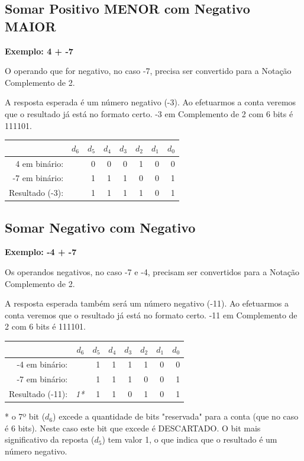 \subsection{Somar Positivo MENOR com Negativo MAIOR}

\noindent\textbf{Exemplo: 4 + -7}

O operando que for negativo, no caso -7, precisa ser convertido para a Notação Complemento de 2. 

A resposta esperada é um número negativo (-3). Ao efetuarmos a conta veremos que o resultado já está no formato certo. -3 em Complemento de 2 com 6 bits é 111101.

\begin{table}[h]
	\centering
	\begin{tabular}{|r|r|r|r|r|r|r|r|}
		\hline			& $d_6$ & $d_5$ & $d_4$ & $d_3$  & $d_2$ & $d_1$ & $d_0$ \\
		\hline
		4 em binário: 	&	& 0 & 0 & 0  & 1 & 0 & 0 \\
		\hline
		-7 em binário:	&	& 1 & 1 & 1  & 0 & 0 & 1 \\
		\hline
		\hline
		Resultado (-3):	&   & 1	& 1 & 1  & 1 & 0 & 1 \\
		\hline
	\end{tabular}
\end{table}


\subsection{Somar Negativo com Negativo}

\noindent\textbf{Exemplo: -4 + -7}

Os operandos negativos, no caso -7 e -4, precisam ser convertidos para a Notação Complemento de 2. 

A resposta esperada também será um número negativo (-11). Ao efetuarmos a conta veremos que o resultado já está no formato certo. -11 em Complemento de 2 com 6 bits é 111101.

\begin{table}[h]
	\centering
	\begin{tabular}{|r|r|r|r|r|r|r|r|}
		\hline			& $d_6$ & $d_5$ & $d_4$ & $d_3$  & $d_2$ & $d_1$ & $d_0$ \\
		\hline
		-4 em binário: 	&	& 1 & 1 & 1  & 1 & 0 & 0 \\
		\hline
		-7 em binário:	&	& 1 & 1 & 1  & 0 & 0 & 1 \\
		\hline
		\hline
		Resultado (-11):	&\emph{1*} 	& 1 & 1 & 0  & 1 & 0 & 1 \\
		\hline
	\end{tabular}
\end{table}
* o 7º bit ($d_6$) excede a quantidade de bits "reservada" para a conta (que no caso é 6 bits). Neste caso este bit que excede é DESCARTADO. O bit mais significativo da reposta ($d_5$) tem valor 1, o que indica que o resultado é um número negativo.



